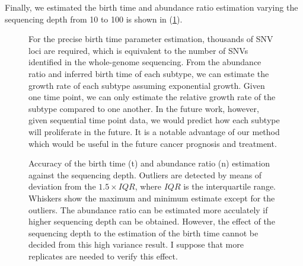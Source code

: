 \documentclass{article}
\begin{document}
Finally, we estimated the birth time and abundance ratio estimation varying the sequencing depth from 10 to 100 is shown in (\ref{fig: read_emission_snv}).

\begin{figure}[H]
   \caption{
 Accuracy of the birth time (t) and abundance ratio (n) estimation against the sequencing depth. Outliers are detected by means of deviation from the $1.5 \times IQR$, where $IQR$ is the interquartile range. Whiskers show the maximum and minimum estimate except for the outliers. The abundance ratio can be estimated more acculately if higher sequencing depth can be obtained.
 However, the effect of the sequencing depth to the estimation of the birth time cannot be decided from this high variance result. I suppose that more replicates are needed to verify this effect.
  }
 \label{fig: read_emission_snv}

 For the precise birth time parameter estimation, thousands of SNV loci are required, which is equivalent to the number of SNVs identified in the whole-genome sequencing. From the abundance ratio and inferred birth time of each subtype, we can estimate the growth rate of each subtype assuming exponential growth. Given one time point, we can only estimate the relative growth rate of the subtype compared to one another. In the future work, however, given sequential time point data, we would predict how each subtype will proliferate in the future. It is a notable advantage of our method which would be useful in the future cancer prognosis and treatment.

\end{figure}
\end{document}
